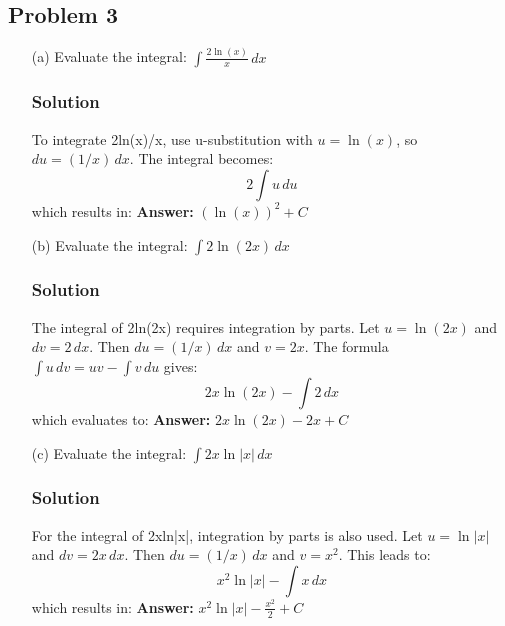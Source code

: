 \documentclass{article}
\begin{document}
\subsection{Problem 3}
\begin{enumerate}
    \item[(a)] Evaluate the integral: $ \int \frac{2\ln(x)}{x} \,dx $
    \subsubsection*{Solution}
    To integrate 2ln(x)/x, use u-substitution with $ u = \ln(x) $, so $ du = (1/x) \,dx $. The integral becomes:
    \[ 2 \int u \,du \]
    which results in:
    \textbf{Answer:} $ (\ln(x))^2 + C $

    \item[(b)] Evaluate the integral: $ \int 2\ln(2x) \,dx $
    \subsubsection*{Solution}
    The integral of 2ln(2x) requires integration by parts. Let $ u = \ln(2x) $ and $ dv = 2 \,dx $. Then $ du = (1/x) \,dx $ and $ v = 2x $. The formula $ \int u \,dv = uv - \int v \,du $ gives:
    \[ 2x\ln(2x) - \int 2 \,dx \]
    which evaluates to:
    \textbf{Answer:} $ 2x\ln(2x) - 2x + C $

    \item[(c)] Evaluate the integral: $ \int 2x\ln|x| \,dx $
    \subsubsection*{Solution}
    For the integral of 2xln|x|, integration by parts is also used. Let $ u = \ln|x| $ and $ dv = 2x \,dx $. Then $ du = (1/x) \,dx $ and $ v = x^2 $. This leads to:
    \[ x^2\ln|x| - \int x \,dx \]
    which results in:
    \textbf{Answer:} $ x^2\ln|x| - \frac{x^2}{2} + C $
\end{enumerate}


\end{document}

